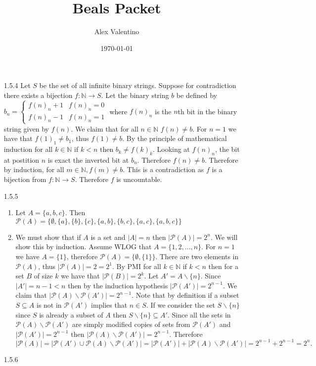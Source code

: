 \documentclass[12pt, letterpaper]{article}
\date{\today}
\author{Alex Valentino}
\title{Beals Packet}
\newcommand{\N}{\mathbb{N}}
\newcommand{\Po}{\mathcal{P}}
\begin{document}
\begin{enumerate}
	\item[1.5.4] Let $S$ be the set of all infinite binary strings.  Suppose for contradiction there exists a bijection $f: \N \to S$.  Let the binary string $b$ be defined by $b_n = \begin{cases} f(n)_n + 1 & f(n)_n = 0\\
	f(n)_n - 1 & f(n)_n = 1  \end{cases}$ where $f(n)_n$ is the $n$th bit in the binary string given by $f(n)$.  We claim that for all $n \in \N$ $f(n) \neq b$.  For $n=1$ we have that $f(1)_1 \neq b_1$, thus $f(1) \neq b$.  By the principle of mathematical induction for all $k \in \N$ if $k < n$ then $b_k \neq f(k)_k$.  Looking at $f(n)_n$, the bit at postition $n$ is exact the inverted bit at $b_n$.  Therefore $f(n) \neq b$.  Therefore by induction, for all $m \in \N, f(m) \neq b$.  This is a contradiction as $f$ is a bijection from $f : \N \to S$.  Therefore $f$ is uncountable.  
	\item[1.5.5] 
	\begin{enumerate}
		\item Let $A = \{a,b,c\}$.  
	Then $\Po(A) = \{\emptyset, \{a\},\{b\},\{c\},\{a,b\},\{b,c\},\{a,c\},\{a,b,c\}\}$
		\item We must show that if $A$ is a set and $|A| = n$ then $|\Po(A)| = 2^n$.  We will show this by induction.  Assume WLOG that $A = \{1,2,\ldots, n\}$.
		 For $n = 1$ we have $A = \{1\}$, therefore 
		$\Po (A) = \{\emptyset,\{1\}\}$.  There are two elements in $\Po(A)$,
		thus $|\Po(A)| = 2 = 2^1$.
		By PMI for all $k \in \N$ if $k < n$ then for a set $B$ of size $k$ we have that $|\Po (B)| = 2^k$.  Let $A' = A\backslash \{n\}$.  
		Since $|A'| = n - 1 < n$ then by the induction hypothesis $|\Po(A')| = 2^{n-1}$.  
		We claim that $|\Po(A)\backslash \Po(A')| = 2^{n-1}$.  Note that by definition if a subset $S \subseteq A$ is not in $\Po(A')$ implies that $n \in S$. 
		 If we consider the set $S \backslash \{n\}$ since $S$ is already a subset of $A$ then $S \backslash \{n\} \subseteq A'$.  Since all the sets in $\Po(A)\backslash \Po(A')$ are simply modified copies of sets from $\Po(A')$ and $|\Po(A')| = 2^{n-1}$ then $|\Po(A)\backslash \Po(A')| = 2^{n-1}$.  Therefore 
		 $$
		 |\Po (A)| = |\Po(A') \cup \Po(A)\backslash \Po(A') | = |\Po(A')| + |\Po(A)\backslash \Po(A')| = 2^{n-1} + 2^{n-1} = 2^n.
		 $$
\end{enumerate}		
	\item[1.5.6]
	\begin{enumerate}

\end{enumerate}
\end{enumerate}
\end{document}
